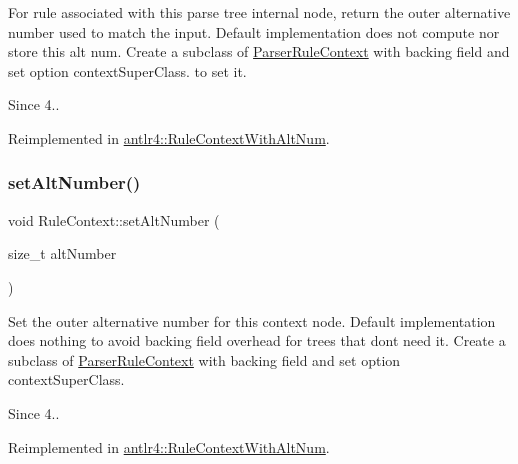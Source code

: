 For rule associated with this parse tree internal node, return the outer alternative number used to match the input. Default implementation does not compute nor store this alt num. Create a subclass of \hyperlink{classantlr4_1_1ParserRuleContext}{Parser\+Rule\+Context} with backing field and set option context\+Super\+Class. to set it.

\begin{DoxySince}{Since}
4.. 
\end{DoxySince}


Reimplemented in \hyperlink{classantlr4_1_1RuleContextWithAltNum_a6efffe072fe42ba82c405545db4e5510}{antlr4\+::\+Rule\+Context\+With\+Alt\+Num}.

\mbox{\label{classantlr4_1_1RuleContext_a13942e9b3fc17ab566e92e6c8c2d88e2}} 
\subsubsection{\texorpdfstring{set\+Alt\+Number()}{setAltNumber()}}
{\footnotesize\ttfamily void Rule\+Context\+::set\+Alt\+Number (\begin{DoxyParamCaption}\item[{size\+\_\+t}]{alt\+Number }\end{DoxyParamCaption})\hspace{0.3cm}{\ttfamily [virtual]}}

Set the outer alternative number for this context node. Default implementation does nothing to avoid backing field overhead for trees that don\textquotesingle{}t need it. Create a subclass of \hyperlink{classantlr4_1_1ParserRuleContext}{Parser\+Rule\+Context} with backing field and set option context\+Super\+Class.

\begin{DoxySince}{Since}
4.. 
\end{DoxySince}


Reimplemented in \hyperlink{classantlr4_1_1RuleContextWithAltNum_adf2d601a196a88f4f399ea5847f44151}{antlr4\+::\+Rule\+Context\+With\+Alt\+Num}.

\mbox{\label{classantlr4_1_1RuleContext_ac4ba5cd65bf384baf9c27be9b14ebcfb}} 
